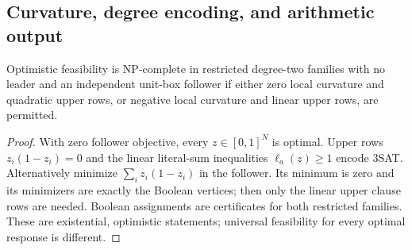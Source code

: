\subsection{Curvature, degree encoding, and arithmetic output}
\label{subsec:arithmetic-boundaries}
\begin{proposition}\label{prop:curvature-boundary}
Optimistic feasibility is NP-complete in restricted degree-two families with
no leader and an independent unit-box follower if either zero local curvature
and quadratic upper rows, or negative local curvature and linear upper rows,
are permitted.
\end{proposition}
\begin{proof}
With zero follower objective, every \(z\in[0,1]^N\) is optimal. Upper rows
\(z_i(1-z_i)=0\) and the linear literal-sum inequalities \(\ell_a(z)\ge1\)
encode 3SAT. Alternatively minimize \(\sum_i z_i(1-z_i)\) in the follower.
Its minimum is zero and its minimizers are exactly the Boolean vertices;
then only the linear upper clause rows are needed. Boolean assignments are
certificates for both restricted families. These are existential, optimistic
statements; universal feasibility for every optimal response is different.
\end{proof}

